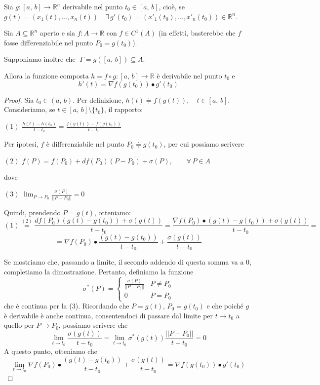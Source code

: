 \begin{proposition}
Sia $g:[a,\,b] \longrightarrow \mathbb{R}^n$ derivabile nel punto $t_0 \in [a,\,b]$, cioè, se $g(t) = (x_1(t),\ldots,x_n(t)) \quad \exists \, g'(t_0) = (x'_1(t_0),\ldots,x'_n(t_0)) \in \mathbb{R}^n$.

Sia $A \subseteq \mathbb{R}^n$ aperto e sia $f : A \longrightarrow \mathbb{R}$ con $f \in C^1(A)$ (in effetti, basterebbe che $f$ fosse differenziabile nel punto $P_0 = g(t_0)$).

Supponiamo inoltre che $\; \Gamma = g([a,\,b]) \subseteq A$.

Allora la funzione composta $h = f \circ g : [a,\,b] \longrightarrow \mathbb{R}$ è derivabile nel punto $t_0$ e
$$
h'(t) = \nabla f(g(t_0)) \bullet g'(t_0)
$$
\end{proposition}
\begin{proof}
Sia $t_0 \in (a,\,b)$. Per definizione, $h(t) \doteqdot f(g(t)), \quad t \in [a,\,b]$. Consideriamo, se $t \in [a,\,b] \setminus \lbrace t_0 \rbrace$, il rapporto:
\begin{center}
$\mathrm{(1)}$
\hfill
$\displaystyle \frac{h(t)-h(t_0)}{t-t_0} = \frac{f(g(t))-f(g(t_0))}{t-t_0}$
\hfill \null \\
\end{center}
Per ipotesi, $f$ è differenziabile nel punto $P_0 \doteqdot g(t_0)$, per cui possiamo scrivere
\begin{center}
$\mathrm{(2)}$
\hfill
$\displaystyle f(P) = f(P_0) +df(P_0)(P-P_0) + \sigma(P), \qquad \forall \, P \in A$
\hfill \null \\
\end{center}
dove
\begin{center}
$\mathrm{(3)}$
\hfill
$\displaystyle \lim_{P \rightarrow P_0} \frac{\sigma(P)}{||P-P_0||} = 0$
\hfill \null \\
\end{center}
Quindi, prendendo $P = g(t)$, otteniamo:
$$\mathrm{(1)} \overset{\mathrm{(2)}}{=} \frac{df(P_0)(g(t)-g(t_0)) + \sigma(g(t))}{t-t_0} = \frac{\nabla f(P_0) \bullet (g(t)-g(t_0)) + \sigma(g(t))}{t-t_0}  = $$
$$ = \nabla f(P_0) \bullet \frac{(g(t)-g(t_0))}{t-t_0} + \frac{\sigma(g(t))}{t-t_0}$$

Se mostriamo che, passando a limite, il secondo addendo di questa somma va a $0$, completiamo la dimostrazione. Pertanto, definiamo la funzione
$$
\sigma^*(P) =
\begin{cases}
\displaystyle \frac{\sigma(P)}{||P-P_0||} & P \neq P_0 \\
0 & P = P_0
\end{cases}
$$
che è continua per la (3). Ricordando che $P = g(t)$, $P_0 = g(t_0)$ e che poiché $g$ è derivabile è anche continua, consentendoci di passare dal limite per $t \rightarrow t_0$ a quello per $P \rightarrow P_0$, possiamo scrivere che
$$\lim_{t \rightarrow t_0} \frac{\sigma(g(t))}{t-t_0} = \lim_{t \rightarrow t_0} \sigma^*(g(t)) \frac{||P-P_0||}{t-t_0} = 0$$
A questo punto, otteniamo che
$$
\lim_{t \rightarrow t_0} \nabla f(P_0) \bullet \frac{(g(t)-g(t_0))}{t-t_0} + \frac{\sigma(g(t))}{t-t_0} =
\nabla f(g(t_0)) \bullet g'(t_0)
$$
\end{proof}


